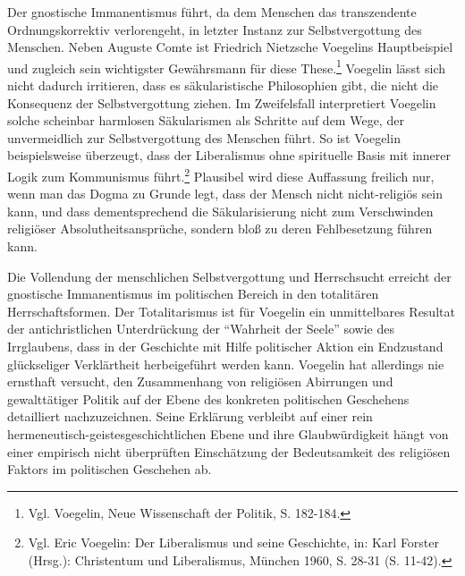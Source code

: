 Der gnostische Immanentismus führt, da dem Menschen das transzendente
Ordnungskorrektiv verlorengeht, in letzter Instanz zur Selbstvergottung des
Menschen. Neben Auguste Comte ist Friedrich Nietzsche Voegelins Hauptbeispiel
und zugleich sein wichtigster Gewährsmann für diese These.\footnote{Vgl.
  Voegelin, Neue Wissenschaft der Politik, S. 182-184.} Voegelin lässt sich
nicht dadurch irritieren, dass es säkularistische Philosophien gibt, die nicht
die Konsequenz der Selbstvergottung ziehen. Im Zweifelsfall interpretiert
Voegelin solche scheinbar harmlosen Säkularismen als Schritte auf dem Wege,
der unvermeidlich zur Selbstvergottung des Menschen führt. So ist Voegelin
beispielsweise überzeugt, dass der Liberalismus ohne spirituelle Basis mit
innerer Logik zum Kommunismus führt.\footnote{Vgl. Eric Voegelin: Der
  Liberalismus und seine Geschichte, in: Karl Forster (Hrsg.): Christentum und
  Liberalismus, München 1960, S. 28-31 (S. 11-42).} Plausibel wird diese
Auf\/fassung freilich nur, wenn man das Dogma zu Grunde legt, dass der Mensch
nicht nicht-religiös sein kann, und dass dementsprechend die Säkularisierung
nicht zum Verschwinden religiöser Absolutheitsansprüche, sondern bloß zu
deren Fehlbesetzung führen kann.

Die Vollendung der menschlichen Selbstvergottung und Herrschsucht erreicht der
gnostische Immanentismus im politischen Bereich in den totalitären
Herrschaftsformen. Der Totalitarismus ist für Voegelin ein unmittelbares
Resultat der antichristlichen Unterdrückung der "`Wahrheit der Seele"' sowie
des Irrglaubens, dass in der Geschichte mit Hilfe politischer Aktion ein
Endzustand glückseliger Verklärtheit herbeigeführt werden kann. Voegelin hat
allerdings nie ernsthaft versucht, den Zusammenhang von religiösen Abirrungen
und gewalttätiger Politik auf der Ebene des konkreten politischen Geschehens
detailliert nachzuzeichnen. Seine Erklärung verbleibt auf einer rein
hermeneutisch-geistesgeschichtlichen Ebene und ihre Glaubwürdigkeit hängt von
einer empirisch nicht überprüften Einschätzung der Bedeutsamkeit des
religiösen Faktors im politischen Geschehen ab.


